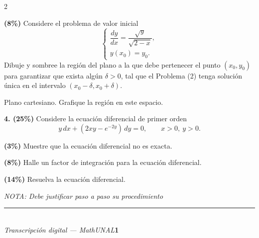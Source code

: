 \documentclass[11pt]{article}
\begin{document}
\begin{multicols}{2}
\begin{opciones}
\columnbreak

\item[d)] \textbf{(8\%)} Considere el problema de valor inicial
\[
\begin{cases}
\dfrac{dy}{dx}=\dfrac{\sqrt{y}}{\sqrt{2-x}}, \\
y(x_0)=y_0.
\end{cases}
\tag{2}
\]
Dibuje y sombree la región del plano a la que debe pertenecer el punto $(x_0,y_0)$ para garantizar que exista algún $\delta>0$, tal que el Problema (2) tenga solución única en el intervalo $(x_0-\delta,x_0+\delta)$.

\begin{center}

{\scriptsize Plano cartesiano. Grafique la región en este espacio.}
\end{center}
\end{opciones}

\end{multicols}

\newpage

\noindent\textbf{4. (25\%)} Considere la ecuación diferencial de primer orden
\[
y\,dx+(2xy-e^{-2y})\,dy=0, \qquad x>0,\ y>0.
\]

\begin{opciones}
\item[a.] \textbf{(3\%)} Muestre que la ecuación diferencial no es exacta.
\item[b.] \textbf{(8\%)} Halle un factor de integración para la ecuación diferencial.
\item[c.] \textbf{(14\%)} Resuelva la ecuación diferencial.
\end{opciones}

\noindent\textit{NOTA: Debe justificar paso a paso su procedimiento}

\vspace{9cm}

\vfill
\rule{\linewidth}{0.4pt}\\[1pt]
{\scriptsize\textit{Transcripción digital --- MathUNAL}\hfill\textcolor{unalblue}{\textbf{1}}}
\end{document}
